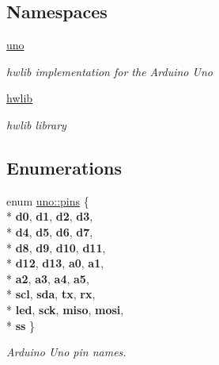 \subsection*{Namespaces}
\begin{DoxyCompactItemize}
\item 
 \hyperlink{namespaceuno}{uno}
\begin{DoxyCompactList}\small\item\em hwlib implementation for the Arduino Uno \end{DoxyCompactList}\item 
 \hyperlink{namespacehwlib}{hwlib}
\begin{DoxyCompactList}\small\item\em hwlib library \end{DoxyCompactList}\end{DoxyCompactItemize}
\subsection*{Enumerations}
\begin{DoxyCompactItemize}
\item 
enum \hyperlink{namespaceuno_a0a859f3512bcc3027a090ae07befd5b2}{uno\+::pins} \{ \\*
{\bfseries d0}, 
{\bfseries d1}, 
{\bfseries d2}, 
{\bfseries d3}, 
\\*
{\bfseries d4}, 
{\bfseries d5}, 
{\bfseries d6}, 
{\bfseries d7}, 
\\*
{\bfseries d8}, 
{\bfseries d9}, 
{\bfseries d10}, 
{\bfseries d11}, 
\\*
{\bfseries d12}, 
{\bfseries d13}, 
{\bfseries a0}, 
{\bfseries a1}, 
\\*
{\bfseries a2}, 
{\bfseries a3}, 
{\bfseries a4}, 
{\bfseries a5}, 
\\*
{\bfseries scl}, 
{\bfseries sda}, 
{\bfseries tx}, 
{\bfseries rx}, 
\\*
{\bfseries led}, 
{\bfseries sck}, 
{\bfseries miso}, 
{\bfseries mosi}, 
\\*
{\bfseries ss}
 \}\begin{DoxyCompactList}\small\item\em Arduino Uno pin names. \end{DoxyCompactList}
\end{DoxyCompactItemize}
